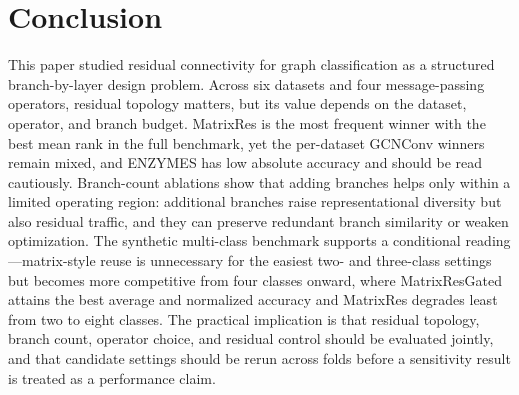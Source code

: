 \section{Conclusion}
\label{sec:conclusion}

This paper studied residual connectivity for graph classification as a
structured branch-by-layer design problem. Across six datasets and four
message-passing operators, residual topology matters, but its value depends on
the dataset, operator, and branch budget. MatrixRes is the most frequent winner
with the best mean rank in the full benchmark, yet the per-dataset GCNConv
winners remain mixed, and ENZYMES has low absolute accuracy and should be read
cautiously. Branch-count ablations show that adding branches helps only within a
limited operating region: additional branches raise representational diversity
but also residual traffic, and they can preserve redundant branch similarity or
weaken optimization. The synthetic multi-class benchmark supports a conditional
reading---matrix-style reuse is unnecessary for the easiest two- and three-class
settings but becomes more competitive from four classes onward, where
MatrixResGated attains the best average and normalized accuracy and MatrixRes
degrades least from two to eight classes. The practical implication is that
residual topology, branch count, operator choice, and residual control should be
evaluated jointly, and that candidate settings should be rerun across folds
before a sensitivity result is treated as a performance claim.
